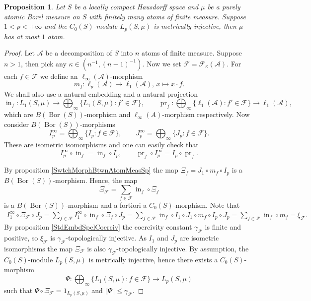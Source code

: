 \documentclass[12pt]{article}
\newtheorem{proposition}[theorem]{Proposition}
\begin{document}
\begin{proposition}\label{MetInjC0SModLpSmuOnFinAtmMeasSpCharac}
    Let $S$ be a locally compact Hausdorff space and $\mu$ be a purely atomic 
    Borel measure on $S$ with finitely many atoms of finite measure. 
    Suppose $1<p<+\infty$ and the $C_0(S)$-module $L_p(S,\mu)$ is metrically 
    injective, then $\mu$ has at most $1$ atom.
\end{proposition}
\begin{proof}
    Let $\mathcal{A}$ be a decomposition of $S$ into $n$ atoms of finite 
    measure. Suppose $n>1$, then pick any $\kappa\in(n^{-1}, (n-1)^{-1})$. 
    Now we set $\mathcal{F}=\mathcal{F}_{\kappa}(\mathcal{A})$. For 
    each $f\in \mathcal{F}$ we define an $\ell_\infty(\mathcal{A})$-morphism 
    \[
        m_f:
        \ell_p(\mathcal{A})\to\ell_1(\mathcal{A}),\,
        x\mapsto x\cdot f.
    \]
    We shall also use a natural embedding and a natural projection
    \[
        \operatorname{in}_f:
        L_1(S,\mu)\to\bigoplus_\infty\{L_1(S,\mu):f'\in\mathcal{F}\},
        \qquad
        \operatorname{pr}_f:
        \bigoplus_\infty\{
            \ell_1(\mathcal{A}):f'\in\mathcal{F}
        \}\to\ell_1(\mathcal{A}),
    \]
    which are $B(\operatorname{Bor}(S))$-morphism 
    and $\ell_\infty(A)$-morphism respectively. 
    Now consider $B(\operatorname{Bor}(S))$-morphisms 
    \[
        I_p^\infty=\bigoplus_\infty\{I_p:f\in\mathcal{F}\},
        \qquad
        J_p^\infty=\bigoplus_\infty\{J_p:f\in\mathcal{F}\}.
    \]
    These are isometric isomorphisms and one can easily check that 
    \[
        I_p^\infty \circ \operatorname{in}_f=\operatorname{in}_f\circ I_p,
        \qquad 
        \operatorname{pr}_f\circ I_p^\infty=I_p\circ \operatorname{pr}_f.
    \]

    By proposition \ref{SwtchMorphBtwnAtomMeasSp} the 
    map $\Xi_f=J_1\circ m_f\circ I_p$ is 
    a $B(\operatorname{Bor}(S))$-morphism. Hence, the map 
    \[
        \Xi_{\mathcal{F}}=\sum_{f\in\mathcal{F}}\operatorname{in}_f\circ \Xi_f
    \]
    is a $B(\operatorname{Bor}(S))$-morphism and a fortiori a $C_0(S)$-morphism. 
    Note that
    \[
    \begin{aligned}
        I_1^\infty\circ\Xi_\mathcal{F}\circ J_p
        = \sum_{f\in\mathcal{F}} 
            I_1^\infty\circ\operatorname{in}_f \circ \Xi_f \circ J_p
        = \sum_{f\in\mathcal{F}} 
            \operatorname{in}_f\circ I_1 \circ 
            J_1 \circ m_f \circ I_p \circ J_p
        =\sum_{f\in\mathcal{F}} \operatorname{in}_f\circ m_f 
        =\xi_{\mathcal{F}}.
    \end{aligned}
    \]
    By proposition \ref{StdEmbdSpclCoerciv} the coercivity 
    constant $\gamma_{\mathcal{F}}$ is finite and positive, 
    so $\xi_{\mathcal{F}}$ is $\gamma_{\mathcal{F}}$-topologically injective.
    As $I_1$ and $J_p$ are isometric isomorphisms the map $\Xi_{\mathcal{F}}$ is
    also $\gamma_{\mathcal{F}}$-topologically injective. By assumption, 
    the $C_0(S)$-module $L_p(S,\mu)$ is metrically injective, hence there 
    exists a $C_0(S)$-morphism 
    \[
        \Psi:
        \bigoplus_\infty\{ L_1(S,\mu):f\in\mathcal{F}\}\to L_p(S,\mu)
    \]
    such that $\Psi\circ \Xi_{\mathcal{F}}=1_{L_p(S,\mu)}$ 
    and $\Vert \Psi\Vert\leq \gamma_{\mathcal{F}}$.


\end{proof}
\end{document}

